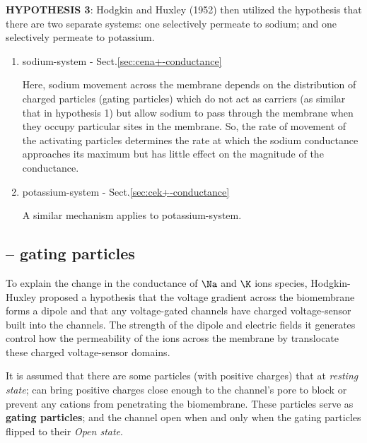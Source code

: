 {\bf HYPOTHESIS 3}:  Hodgkin and Huxley (1952) then utilized the hypothesis that
there are two separate systems: one selectively permeate to sodium; and one
selectively permeate to potassium. 
\begin{enumerate}
  \item sodium-system - Sect.\ref{sec:cena+-conductance}
  
  Here, sodium movement across the membrane depends on the distribution of
  charged particles (gating particles) which do not act as carriers (as similar
  that in hypothesis 1) but allow sodium to pass through the membrane when they
  occupy particular sites in the membrane. So, the rate of movement of the
  activating particles determines the rate at which the sodium conductance
  approaches its maximum but has little effect on the magnitude of the
  conductance. 
  
  \item potassium-system - Sect.\ref{sec:cek+-conductance}

A similar mechanism applies to potassium-system.

\end{enumerate}




\subsection{-- gating particles}
\label{sec:gating-particles}

To explain the change in the conductance of $\Na$ and $\K$ ions species,
Hodgkin-Huxley proposed a hypothesis that the voltage gradient across the
biomembrane forms a dipole and that any voltage-gated channels have charged
voltage-sensor built into the channels. The strength of the dipole and electric
fields it generates control how the permeability of the ions across the
membrane by translocate these charged voltage-sensor domains.

It is assumed that there are some particles (with positive charges) that at {\it
resting state}; can bring positive charges close enough to the channel's pore to
block or prevent any cations  from penetrating the biomembrane.
These particles serve as {\bf gating particles}; and the channel open when and
only when the gating particles flipped to their {\it Open state}.

